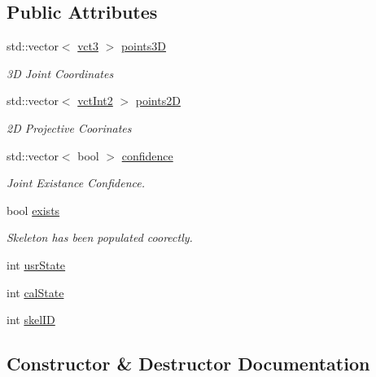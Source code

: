 \subsection*{Public Attributes}
\begin{DoxyCompactItemize}
\item 
std\+::vector$<$ \hyperlink{vct_fixed_size_vector_types_8h_a3af82acdbf4eeb73c551909240b106ea}{vct3} $>$ \hyperlink{classosa_open_n_i_skeleton_a69590f30ce352cd80be31757dcea8351}{points3\+D}
\begin{DoxyCompactList}\small\item\em 3\+D Joint Coordinates \end{DoxyCompactList}\item 
std\+::vector$<$ \hyperlink{vct_fixed_size_vector_types_8h_add8c88eb6a432b15f14b866b9c35325f}{vct\+Int2} $>$ \hyperlink{classosa_open_n_i_skeleton_af72455ac2eb4611fefc465d08a415b59}{points2\+D}
\begin{DoxyCompactList}\small\item\em 2\+D Projective Coorinates \end{DoxyCompactList}\item 
std\+::vector$<$ bool $>$ \hyperlink{classosa_open_n_i_skeleton_ac7f0ce45a28ff3065dc83f2e71175987}{confidence}
\begin{DoxyCompactList}\small\item\em Joint Existance Confidence. \end{DoxyCompactList}\item 
bool \hyperlink{classosa_open_n_i_skeleton_aaad274b86c6213c48c1aa2bdcd053195}{exists}
\begin{DoxyCompactList}\small\item\em Skeleton has been populated coorectly. \end{DoxyCompactList}\item 
int \hyperlink{classosa_open_n_i_skeleton_afd56b36e28cdc37b1f8e9e028537af41}{usr\+State}
\item 
int \hyperlink{classosa_open_n_i_skeleton_a3edad6b75218a0029aba98aacdf19aae}{cal\+State}
\item 
int \hyperlink{classosa_open_n_i_skeleton_acff0bacc1bc0f3411a2ee8ebd541e1b9}{skel\+I\+D}
\end{DoxyCompactItemize}


\subsection{Constructor \& Destructor Documentation}
\hypertarget{classosa_open_n_i_skeleton_a5c40f05bc1f79ba5fb4f1c422ba89c86}{}
